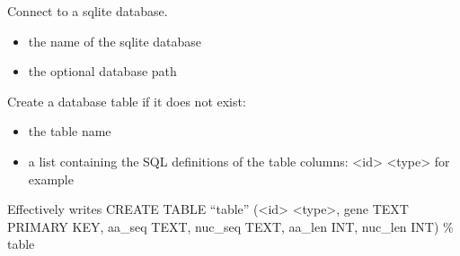 \documentclass[letterpaper,10pt,english]{sphinxmanual}
\begin{document}
\begin{fulllineitems}
\begin{fulllineitems}
\end{fulllineitems}


\begin{fulllineitems}
\label{\detokenize{modules_doc:cbmpy.CBNetDB.DBTools.connectSQLiteDB}}
\pysigstartsignatures
{}
\pysigstopsignatures
\sphinxAtStartPar
Connect to a sqlite database.
\begin{itemize}
\item {} 
\sphinxAtStartPar
{} the name of the sqlite database

\item {} 
\sphinxAtStartPar
{} the optional database path

\end{itemize}

\end{fulllineitems}


\begin{fulllineitems}
\label{\detokenize{modules_doc:cbmpy.CBNetDB.DBTools.createDBTable}}
\pysigstartsignatures
{}
\pysigstopsignatures
\sphinxAtStartPar
Create a database table if it does not exist:
\begin{itemize}
\item {} 
\sphinxAtStartPar
{} the table name

\item {} 
\sphinxAtStartPar
{} a list containing the SQL definitions of the table columns: \textless{}id\textgreater{} \textless{}type\textgreater{} for example 

\end{itemize}

\sphinxAtStartPar
Effectively writes CREATE TABLE “table” (\textless{}id\textgreater{} \textless{}type\textgreater{}, gene TEXT PRIMARY KEY, aa\_seq TEXT, nuc\_seq TEXT, aa\_len INT, nuc\_len INT) \% table


\end{fulllineitems}
\end{fulllineitems}
\end{document}
